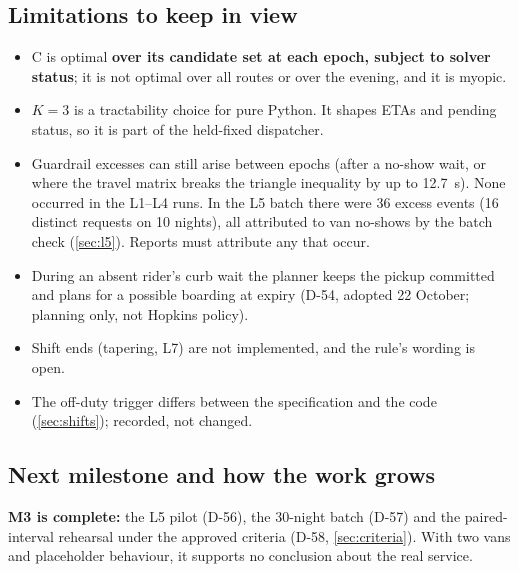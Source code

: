 \documentclass[11pt,letterpaper]{article}
\newcommand{\D}[1]{D-#1}
\begin{document}
\subsection{Limitations to keep in view}
\begin{itemize}
\item C is optimal \textbf{over its candidate set at each epoch, subject to solver status}; it is not optimal over all routes or over the evening, and it is myopic.
\item $K = 3$ is a tractability choice for pure Python. It shapes ETAs and pending status, so it is part of the held-fixed dispatcher.
\item Guardrail excesses can still arise between epochs (after a no-show wait, or where the travel matrix breaks the triangle inequality by up to 12.7~s). None occurred in the L1--L4 runs. In the L5 batch there were 36 excess events (16 distinct requests on 10 nights), all attributed to van no-shows by the batch check (\cref{sec:l5}). Reports must attribute any that occur.
\item During an absent rider's curb wait the planner keeps the pickup committed and plans for a possible boarding at expiry (\D{54}, adopted 22 October; planning only, not Hopkins policy).
\item Shift ends (tapering, L7) are not implemented, and the rule's wording is open.
\item The off-duty trigger differs between the specification and the code (\cref{sec:shifts}); recorded, not changed.
\end{itemize}

\subsection{Next milestone and how the work grows}
\textbf{M3 is complete:} the L5 pilot (\D{56}), the 30-night batch (\D{57}) and the paired-interval rehearsal under the approved criteria (\D{58}, \cref{sec:criteria}). With two vans and placeholder behaviour, it supports no conclusion about the real service.
\end{document}
